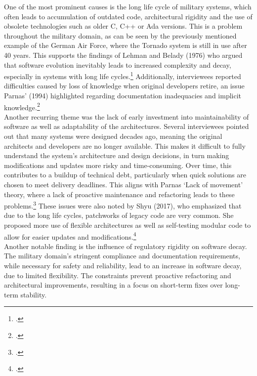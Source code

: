 One of the most prominent causes is the long life cycle of military systems, which often leads to accumulation of outdated code, architectural rigidity and the use of obsolete technologies such as older C, C++ or Ada versions.
This is a problem throughout the military domain, as can be seen by the previously mentioned example of the German Air Force, where the Tornado system is still in use after 40 years.
This supports the findings of Lehman and Belady (1976) who argued that software evolution inevitably leads to increased complexity and decay, especially in systems with long life cycles.\footcite[228]{beladyModelLargeProgram1976}
Additionally, interviewees reported difficulties caused by loss of knowledge when original developers retire, an issue Parnas' (1994) highlighted regarding documentation inadequacies and implicit knowledge.\footcite[280-281]{296790}\\

Another recurring theme was the lack of early investment into maintainability of software as well as adaptability of the architectures. Several interviewees pointed out that many systems were designed decades ago, meaning the original architects and developers are no longer available.
This makes it difficult to fully understand the system's architecture and design decisions, in turn making modifications and updates more risky and time-consuming. 
Over time, this contributes to a buildup of technical debt, particularly when quick solutions are chosen to meet delivery deadlines.
This aligns with Parnas `Lack of movement' theory, where a lack of proactive maintenance and refactoring leads to these problems.\footcite[280]{296790}
These issues were also noted by Shyu (2017), who emphasized that due to the long life cycles, patchworks of legacy code are very common. She proposed more use of flexible architectures as well as self-testing modular code to allow for easier updates and modifications.\footcite[15-17]{shyu2017military}\\

Another notable finding is the influence of regulatory rigidity on software decay. The military domain's stringent compliance and documentation requirements, while necessary for safety and reliability, lead to an increase in software decay, due to limited flexibility.
The constraints prevent proactive refactoring and architectural improvements, resulting in a focus on short-term fixes over long-term stability.

